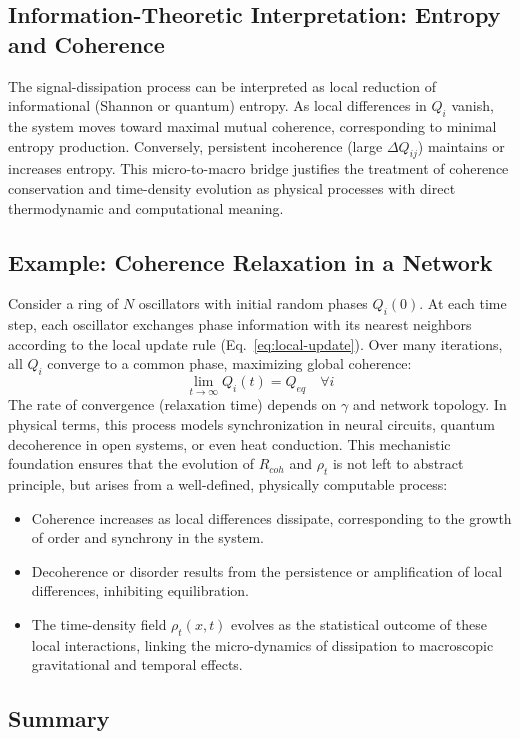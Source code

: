 \documentclass[american,11pt,letterpaper]{article}
\def\mathrm#1{#1}%
\def\emph#1{#1}%
\begin{document}
\subsection{Information-Theoretic Interpretation: Entropy and Coherence}

The signal-dissipation process can be interpreted as local reduction of informational (Shannon or quantum) entropy.
As local differences in $Q_i$ vanish, the system moves toward maximal mutual coherence, corresponding to minimal entropy production.
Conversely, persistent incoherence (large $\Delta Q_{ij}$) maintains or increases entropy.
This micro-to-macro bridge justifies the treatment of coherence conservation and time-density evolution as physical processes with direct thermodynamic and computational meaning.
\subsection{Example: Coherence Relaxation in a Network}

Consider a ring of $N$ oscillators with initial random phases $Q_i(0)$.
At each time step, each oscillator exchanges phase information with its nearest neighbors according to the local update rule (Eq.~\ref{eq:local-update}).
Over many iterations, all $Q_i$ converge to a common phase, maximizing global coherence:
\[
\lim_{t \to \infty} Q_i(t) = Q_{\mathrm{eq}} \quad \forall i
\]
The rate of convergence (relaxation time) depends on $\gamma$ and network topology.
In physical terms, this process models synchronization in neural circuits, quantum decoherence in open systems, or even heat conduction.
This mechanistic foundation ensures that the evolution of $R_{\mathrm{coh}}$ and $\rho_t$ is not left to abstract principle, but arises from a well-defined, physically computable process:
\begin{itemize}
    \item \emph{Coherence increases} as local differences dissipate, corresponding to the growth of order and synchrony in the system.
\item \emph{Decoherence or disorder} results from the persistence or amplification of local differences, inhibiting equilibration.
\item The \emph{time-density field} $\rho_t(x,t)$ evolves as the statistical outcome of these local interactions, linking the micro-dynamics of dissipation to macroscopic gravitational and temporal effects.
\end{itemize}

\subsection{Summary}
\end{document}
